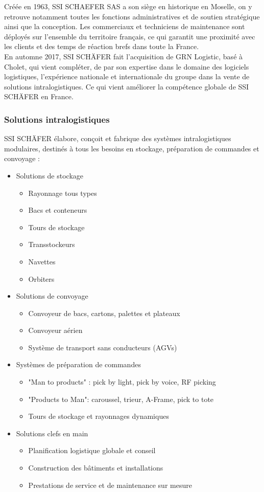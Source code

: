 \documentclass[a4paper, 12pt, french]{article}
\newcommand{\bdot}{\item[\color{ssiYellow}\ding{108}]}
\newcommand{\bdotoutlined}{\item[\color{ssiYellow}\ding{109}]}
\begin{document}
	Créée en 1963, SSI SCHAEFER SAS a son siège en historique en Moselle, on y retrouve notamment toutes les fonctions administratives et de soutien stratégique ainsi que la conception. Les commerciaux et techniciens de maintenance sont déployés sur l'ensemble du territoire français, ce qui garantit une proximité avec les clients et des temps de réaction brefs dans toute la France.\\

	En automne 2017, SSI SCHÄFER fait l'acquisition de GRN Logistic, basé à Cholet, qui vient compléter, de par son expertise dans le domaine des logiciels logistiques, l'expérience nationale et internationale du groupe dans la vente de solutions intralogistiques. Ce qui vient améliorer la compétence globale de SSI SCHÄFER en France.
			
		\subsubsection{Solutions intralogistiques}
	SSI SCHÄFER élabore, conçoit et fabrique des systèmes intralogistiques modulaires, destinés à tous les besoins en stockage, préparation de commandes et convoyage :
				\begin{itemize}
					\bdot{Solutions de stockage}
						\begin{itemize}
							\bdotoutlined{Rayonnage tous types}
							\bdotoutlined{Bacs et conteneurs}
							\bdotoutlined{Tours de stockage}
							\bdotoutlined{Transstockeurs}
							\bdotoutlined{Navettes}
							\bdotoutlined{Orbiters}
						\end{itemize}
					\bdot{Solutions de convoyage}
						\begin{itemize}
							\bdotoutlined{Convoyeur de bacs, cartons, palettes et plateaux}
							\bdotoutlined{Convoyeur aérien}
							\bdotoutlined{Système de transport sans conducteurs (AGVs)}
						\end{itemize}
					\bdot{Systèmes de préparation de commandes}
						\begin{itemize}
							\bdotoutlined{"Man to products" : pick by light, pick by voice, RF picking}
							\bdotoutlined{"Products to Man": caroussel, trieur, A-Frame, pick to tote}
							\bdotoutlined{Tours de stockage et rayonnages dynamiques}
						\end{itemize}
					\bdot{Solutions clefs en main}
						\begin{itemize}
							\bdotoutlined{Planification logistique globale et conseil}
							\bdotoutlined{Construction des bâtiments et installations}
							\bdotoutlined{Prestations de service et de maintenance sur mesure}
						\end{itemize}
				\end{itemize}
\end{document}
